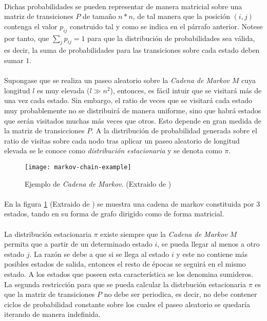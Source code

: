 \documentclass{subfiles}
\begin{document}
        \paragraph{}
        Dichas probabilidades se pueden representar de manera matricial sobre una matriz de transiciones $P$ de tamaño $n*n$, de tal manera que la posición $(i,j)$ contenga el valor $p_{ij}$ construido tal y como se indica en el párrafo anterior. Notese por tanto, que $\sum_{j}p_{ij}=1$ para que la distribución de probabilidades sea válida, es decir, la suma de probabilidades para las transiciones sobre cada estado deben sumar $1$.

        \paragraph{}
        Supongase que se realiza un paseo aleatorio sobre la \emph{Cadena de Markov} $M$ cuya longitud $l$ es muy elevada ($l \gg n^2$), entonces, es fácil intuir que se visitará más de una vez cada estado. Sin embargo, el ratio de veces que se visitará cada estado muy probablemente no se distribuirá de manera uniforme, sino que habrá estados que serán visitados muchas más veces que otros. Esto depende en gran medida de la matriz de transicciones $P$. A la distribución de probabilidad generada sobre el ratio de visitas sobre cada nodo tras aplicar un paseo aleatorio de longitud elevada se le conoce como \emph{distribución estacionaria} y se denota como $\pi$.

        \begin{figure}
          \centering
          \texttt{[image: markov-chain-example]}
          \caption{Ejemplo de \emph{Cadena de Markov}. (Extraido de \cite{sanchez2012wireless})}
          \label{img:markov_chain_example}
        \end{figure}

        \paragraph{}
        En la figura \ref{img:markov_chain_example} (Extraido de \cite{sanchez2012wireless}) se muestra una cadena de markov constituida por 3 estados, tando en su forma de grafo dirigido como de forma matricial.

        \paragraph{}
        La distribución estacionaria $\pi$ existe siempre que la \emph{Cadena de Markov} $M$ permita que a partir de un determinado estado $i$, se pueda llegar al menos a otro estado $j$. La razón se debe a que si se llega al estado $i$ y este no contiene más posibles estados de salida, entonces el resto de épocas se seguirá en el mismo estado. A los estados que poseen esta característica se los denomina sumideros. La segunda restricción para que se pueda calcular la distrbución estacionaria $\pi$ es que la matriz de transiciones $P$ no debe ser periodica, es decir, no debe contener ciclos de probabilidad constante sobre los cuales el paseo aleatorio se quedaría iterando de manera indefinida.
\end{document}
